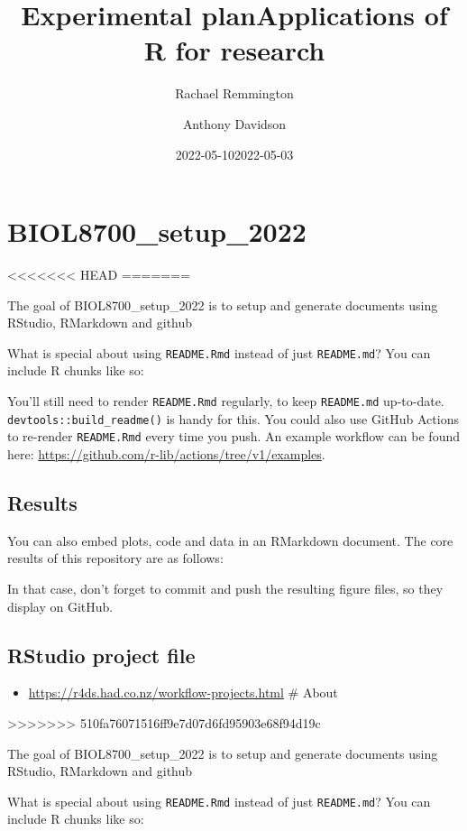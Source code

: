 \documentclass[
]{book}
\title{Experimental plan}
\author{Rachael Remmington}
\date{2022-05-10}
\title{Applications of R for research}
\author{Anthony Davidson}
\date{2022-05-03}
\providecommand{\tightlist}{%
  \setlength{\itemsep}{0pt}\setlength{\parskip}{0pt}}
\begin{document}
\maketitle

{
\setcounter{tocdepth}{1}
\tableofcontents
}
\hypertarget{biol8700_setup_2022}{%
\chapter{BIOL8700\_setup\_2022}\label{biol8700_setup_2022}}
<<<<<<< HEAD
=======

The goal of BIOL8700\_setup\_2022 is to setup and generate documents using RStudio, RMarkdown and github

What is special about using \texttt{README.Rmd} instead of just \texttt{README.md}? You can include R chunks like so:

You'll still need to render \texttt{README.Rmd} regularly, to keep \texttt{README.md} up-to-date. \texttt{devtools::build\_readme()} is handy for this. You could also use GitHub Actions to re-render \texttt{README.Rmd} every time you push. An example workflow can be found here: \url{https://github.com/r-lib/actions/tree/v1/examples}.

\hypertarget{results}{%
\section{Results}\label{results}}

You can also embed plots, code and data in an RMarkdown document. The core results of this repository are as follows:

In that case, don't forget to commit and push the resulting figure files, so they display on GitHub.

\hypertarget{rstudio-project-file}{%
\section{RStudio project file}\label{rstudio-project-file}}

\begin{itemize}
\tightlist
\item
  \url{https://r4ds.had.co.nz/workflow-projects.html}
  \# About
\end{itemize}
>>>>>>> 510fa76071516ff9e7d07d6fd95903e68f94d19c

The goal of BIOL8700\_setup\_2022 is to setup and generate documents using RStudio, RMarkdown and github

What is special about using \texttt{README.Rmd} instead of just \texttt{README.md}? You can include R chunks like so:
\end{document}

